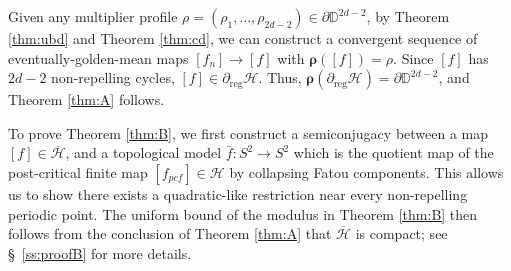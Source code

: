 \documentclass[11pt, reqno]{amsart}
\numberwithin{equation}{section}
\theoremstyle{plain}
\theoremstyle{theorem}
\theoremstyle{plain}
\theoremstyle{definition}
\newcommand{\D}{\mathbb{D}}
\numberwithin{figure}{section}
\begin{document}
Given any multiplier profile $\rho = (\rho_1,..., \rho_{2d-2}) \in \partial \D^{2d-2}$, by Theorem \ref{thm:ubd} and Theorem \ref{thm:cd}, we can construct a convergent sequence of eventually-golden-mean maps $[f_n] \to [f]$ with $\boldsymbol{\rho}([f]) = \rho$.
Since $[f]$ has $2d-2$ non-repelling cycles, $[f] \in \partial_{\operatorname{reg}}\mathcal{H}$.
Thus, $\boldsymbol{\rho}(\partial_{\operatorname{reg}}\mathcal{H}) = \partial\D^{2d-2}$, and Theorem \ref{thm:A} follows.



To prove Theorem \ref{thm:B}, we first construct a semiconjugacy between a map $[f]\in \overline{\mathcal{H}}$, and a topological model $\bar{f}: S^2 \longrightarrow S^2$ which is the quotient map of the post-critical finite map $[f_{pcf}] \in \mathcal{H}$ by collapsing Fatou components.
This allows us to show there exists a quadratic-like restriction near every non-repelling periodic point.
The uniform bound of the modulus in Theorem \ref{thm:B} then follows from the conclusion of Theorem \ref{thm:A} that $\overline{\mathcal{H}}$ is compact; see \S~\ref{ss:proofB} for more details.
\end{document}
